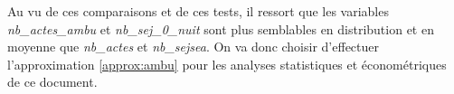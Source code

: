 Au vu de ces comparaisons et de ces tests, il ressort que les variables \textit{nb\_actes\_ambu} et \textit{nb\_sej\_0\_nuit} sont plus semblables en distribution et en moyenne que \textit{nb\_actes} et \textit{nb\_sejsea}. On va donc choisir d'effectuer l'approximation \ref{approx:ambu} pour les analyses statistiques et économétriques de ce document.